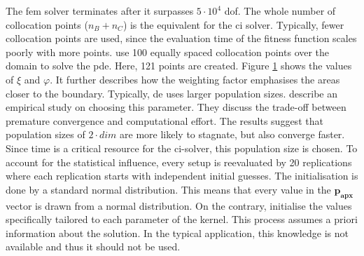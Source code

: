 \documentclass[./\jobname.tex]{subfiles}
\begin{document}
The \gls{fem} solver terminates after it surpasses $5 \cdot 10^4$ \gls{dof}. The whole number of collocation points ($n_B + n_C$) is the equivalent for the \gls{ci} solver. Typically, fewer collocation points are used, since the evaluation time of the fitness function scales poorly with more points. \cite{chaquet_using_2019} use 100 equally spaced collocation points over the domain to solve the \gls{pde}. Here, 121 points are created. Figure \ref{fig:collocation_weight} shows the values of $\xi$ and $\varphi$. It further describes how the weighting factor emphasises the areas closer to the boundary. Typically, \gls{de} uses larger population sizes. \cite{mallipeddi_empirical_2008} describe an empirical study on choosing this parameter. They discuss the trade-off between premature convergence and computational effort. The results suggest that population sizes of $2\cdot dim$ are more likely to stagnate, but also converge faster. Since time is a critical resource for the \gls{ci}-solver, this population size is chosen. To account for the statistical influence, every setup is reevaluated by 20 replications where each replication starts with independent initial guesses. The initialisation is done by a standard normal distribution. This means that every value in the $\mathbf{p_{apx}}$ vector is drawn from a normal distribution. On the contrary, \cite{chaquet_using_2019} initialise the values specifically tailored to each parameter of the kernel. This process assumes a priori information about the solution. In the typical application, this knowledge is not available and thus it should not be used. 
\begin{figure}[H]
	\centering
	\noindent{}
	\label{fig:collocation_weight}
\end{figure}
\end{document}

